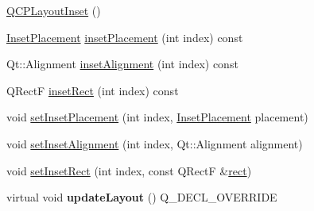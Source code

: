 \begin{DoxyCompactItemize}
\item 
\hyperlink{classQCPLayoutInset_a3ad984f3221735374cc5dee14356a7dd}{Q\+C\+P\+Layout\+Inset} ()
\item 
\hyperlink{classQCPLayoutInset_a8b9e17d9a2768293d2a7d72f5e298192}{Inset\+Placement} \hyperlink{classQCPLayoutInset_a8472ff2508807513e4cb0ce0c1d652b3}{inset\+Placement} (int index) const 
\item 
Qt\+::\+Alignment \hyperlink{classQCPLayoutInset_a78c0c494bb5728237cebb63ae8ef5c58}{inset\+Alignment} (int index) const 
\item 
Q\+RectF \hyperlink{classQCPLayoutInset_a5ec7037b3b8d20fbf9560e01779b1442}{inset\+Rect} (int index) const 
\item 
void \hyperlink{classQCPLayoutInset_a63298830744d5d8c5345511c00fd2144}{set\+Inset\+Placement} (int index, \hyperlink{classQCPLayoutInset_a8b9e17d9a2768293d2a7d72f5e298192}{Inset\+Placement} placement)
\item 
void \hyperlink{classQCPLayoutInset_a62882a4f9ad58bb0f53da12fde022abe}{set\+Inset\+Alignment} (int index, Qt\+::\+Alignment alignment)
\item 
void \hyperlink{classQCPLayoutInset_aa487c8378a6f9533567a2e6430099dc3}{set\+Inset\+Rect} (int index, const Q\+RectF \&\hyperlink{classQCPLayoutElement_affdfea003469aac3d0fac5f4e06171bc}{rect})
\item 
virtual void {\bfseries update\+Layout} () Q\+\_\+\+D\+E\+C\+L\+\_\+\+O\+V\+E\+R\+R\+I\+DE\hypertarget{classQCPLayoutInset_a493526b922ea66a75c45ef1842446988}{}\label{classQCPLayoutInset_a493526b922ea66a75c45ef1842446988}


\end{DoxyCompactItemize}
